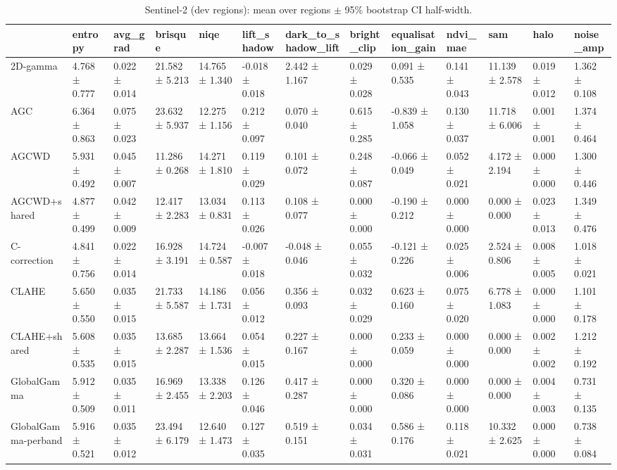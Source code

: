 \begin{table}[t]
\caption{Sentinel-2 (dev regions): mean over regions $\pm$ 95\% bootstrap CI half-width.}
\label{tab:s2_summary_dev}
\begin{tabular}{lllllllllllll}
\toprule
 & entropy & avg\_grad & brisque & niqe & lift\_shadow & dark\_to\_shadow\_lift & bright\_clip & equalisation\_gain & ndvi\_mae & sam & halo & noise\_amp \\
\midrule
2D-gamma & 4.768 ± 0.777 & 0.022 ± 0.014 & 21.582 ± 5.213 & 14.765 ± 1.340 & -0.018 ± 0.018 & 2.442 ± 1.167 & 0.029 ± 0.028 & 0.091 ± 0.535 & 0.141 ± 0.043 & 11.139 ± 2.578 & 0.019 ± 0.012 & 1.362 ± 0.108 \\
AGC & 6.364 ± 0.863 & 0.075 ± 0.023 & 23.632 ± 5.937 & 12.275 ± 1.156 & 0.212 ± 0.097 & 0.070 ± 0.040 & 0.615 ± 0.285 & -0.839 ± 1.058 & 0.130 ± 0.037 & 11.718 ± 6.006 & 0.001 ± 0.001 & 1.374 ± 0.464 \\
AGCWD & 5.931 ± 0.492 & 0.045 ± 0.007 & 11.286 ± 0.268 & 14.271 ± 1.810 & 0.119 ± 0.029 & 0.101 ± 0.072 & 0.248 ± 0.087 & -0.066 ± 0.049 & 0.052 ± 0.021 & 4.172 ± 2.194 & 0.000 ± 0.000 & 1.300 ± 0.446 \\
AGCWD+shared & 4.877 ± 0.499 & 0.042 ± 0.009 & 12.417 ± 2.283 & 13.034 ± 0.831 & 0.113 ± 0.026 & 0.108 ± 0.077 & 0.000 ± 0.000 & -0.190 ± 0.212 & 0.000 ± 0.000 & 0.000 ± 0.000 & 0.023 ± 0.013 & 1.349 ± 0.476 \\
C-correction & 4.841 ± 0.756 & 0.022 ± 0.014 & 16.928 ± 3.191 & 14.724 ± 0.587 & -0.007 ± 0.018 & -0.048 ± 0.046 & 0.055 ± 0.032 & -0.121 ± 0.226 & 0.025 ± 0.006 & 2.524 ± 0.806 & 0.008 ± 0.005 & 1.018 ± 0.021 \\
CLAHE & 5.650 ± 0.550 & 0.035 ± 0.015 & 21.733 ± 5.587 & 14.186 ± 1.731 & 0.056 ± 0.012 & 0.356 ± 0.093 & 0.032 ± 0.029 & 0.623 ± 0.160 & 0.075 ± 0.020 & 6.778 ± 1.083 & 0.000 ± 0.000 & 1.101 ± 0.178 \\
CLAHE+shared & 5.608 ± 0.535 & 0.035 ± 0.015 & 13.685 ± 2.287 & 13.664 ± 1.536 & 0.054 ± 0.015 & 0.227 ± 0.167 & 0.000 ± 0.000 & 0.233 ± 0.059 & 0.000 ± 0.000 & 0.000 ± 0.000 & 0.002 ± 0.002 & 1.212 ± 0.192 \\
GlobalGamma & 5.912 ± 0.509 & 0.035 ± 0.011 & 16.969 ± 2.455 & 13.338 ± 2.203 & 0.126 ± 0.046 & 0.417 ± 0.287 & 0.000 ± 0.000 & 0.320 ± 0.086 & 0.000 ± 0.000 & 0.000 ± 0.000 & 0.004 ± 0.003 & 0.731 ± 0.135 \\
GlobalGamma-perband & 5.916 ± 0.521 & 0.035 ± 0.012 & 23.494 ± 6.179 & 12.640 ± 1.473 & 0.127 ± 0.035 & 0.519 ± 0.151 & 0.034 ± 0.031 & 0.586 ± 0.176 & 0.118 ± 0.021 & 10.332 ± 2.625 & 0.000 ± 0.000 & 0.738 ± 0.084 \\

\end{tabular}
\end{table}
